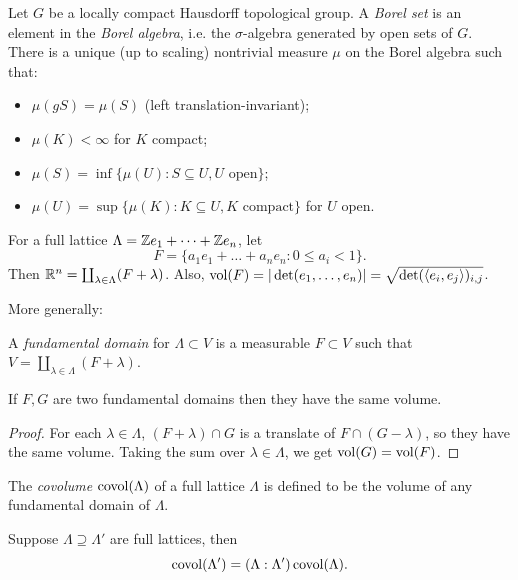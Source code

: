 \documentclass[11pt]{amsart}
\begin{document}
\begin{thm}
\label{Haar}
Let $G$ be a locally compact Hausdorff topological group. A \emph{Borel set} is an element in the \emph{Borel algebra}, i.e. the $\sigma$-algebra generated by open sets of $G$. There is a unique (up to scaling) nontrivial measure $\mu$ on the Borel algebra such that:
\begin{itemize}
    \item $\mu(gS) = \mu(S)$ (left translation-invariant);
    \item $\mu(K) < \infty$ for $K$ compact;
    \item $\mu(S) = \inf\{\mu(U): S\subseteq U, U\text{ open}\}$;
    \item $\mu(U) = \sup\{\mu(K): K\subseteq U, K\text{ compact}\}$ for $U$ open.
\end{itemize}
\end{thm}

For a full lattice $\Lambda = \mathbb{Z} e_1 + \dots + \mathbb{Z} e_n$, let 
\[F = \{a_1e_1 + \dots + a_ne_n : 0\le a_i < 1\}.\]
Then $\mathbb{R}^n = \coprod_{\lambda\in \Lambda} (F+\lambda)$. Also, $\operatorname{vol}(F) = |\det(e_1,\dots,e_n)| = \sqrt{\det (\langle e_i,e_j\rangle)_{i,j}}$.

More generally:

\begin{defn}
A \emph{fundamental domain} for $\Lambda\subset V$ is a measurable $F\subset V$ such that $V = \coprod_{\lambda\in \Lambda} (F+\lambda)$.
\end{defn}

\begin{prop}
If $F,G$ are two fundamental domains then they have the same volume.
\end{prop}

\begin{proof}
For each $\lambda\in \Lambda$, $(F+\lambda)\cap G$ is a translate of $F\cap(G-\lambda)$, so they have the same volume. Taking the sum over $\lambda\in \Lambda$, we get $\operatorname{vol}(G) = \operatorname{vol}(F)$.
\end{proof}

\begin{defn}
The \emph{covolume} $\operatorname{covol}(\Lambda)$ of a full lattice $\Lambda$ is defined to be the volume of any fundamental domain of $\Lambda$.
\end{defn}

\begin{prop}
Suppose $\Lambda \supseteq \Lambda'$ are full lattices, then
\[\operatorname{covol}(\Lambda') = (\Lambda:\Lambda')\operatorname{covol}(\Lambda).\]
\end{prop}
\end{document}
